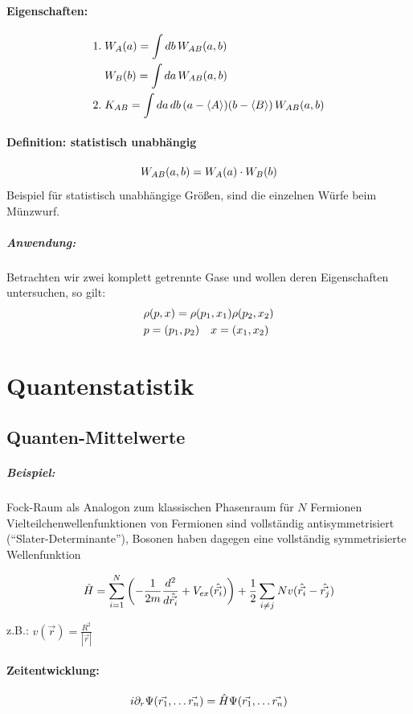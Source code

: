 \paragraph{Eigenschaften:}
\begin{align*}
	1.\; &W_{A}(a) = \int db \, W_{AB}(a,b)\\
	     &W_{B}(b) = \int da \, W_{AB}(a,b)\\
	2.\; &K_{AB} = \int da \, db \, ( a - \langle A \rangle ) (b - \langle B \rangle ) \, 
	     W_{AB}(a,b)
\end{align*}

\paragraph{Definition: statistisch unabhängig}
\[
	W_{AB}(a,b) = W_{A}(a) \cdot W_{B}(b)
\]
Beispiel für statistisch unabhängige Größen, sind die einzelnen Würfe beim Münzwurf.

\subparagraph{Anwendung:}
Betrachten wir zwei komplett getrennte Gase und wollen deren Eigenschaften
untersuchen, so gilt:
\begin{align*}
	&\rho ( p , x ) = \rho (p_{1}, x_{1}) \rho (p_{2}, x_{2})\\
	&p=(p_{1},p_{2}) \quad x = (x_{1}, x_{2})
\end{align*}

	\section{Quantenstatistik}
	\subsection{Quanten-Mittelwerte}

\subparagraph{Beispiel:} Fock-Raum als Analogon zum klassischen Phasenraum für $N$
Fermionen\\

Vielteilchenwellenfunktionen von Fermionen sind vollständig antisymmetrisiert
("`Slater-Determinante"'), Bosonen haben dagegen eine vollständig symmetrisierte 
Wellenfunktion

\[
    \hat{H} = \sum_{i=1}^{N} \left( - \frac{1}{2m} \frac{d^{2}}{d\hat{\vec{r_{i}}}} + V_{ex}
               (\hat{\vec{r_{i}}}) \right) + \frac12 \sum_{i \neq j}{N} v(\hat{\vec{r_{i}}} - \hat{\vec{r_{j}}})
\]

z.B.: $v(\vec{r}) = \frac{R^{2}}{|\vec{r}|}$

\paragraph{Zeitentwicklung:}
\[
    i \partial_{r} \Psi ( \vec{r_{1}}, \dots \vec{r_{n}}) = \hat{H} \Psi ( \vec{r_{1}}, \dots \vec{r_{n}})
\]


